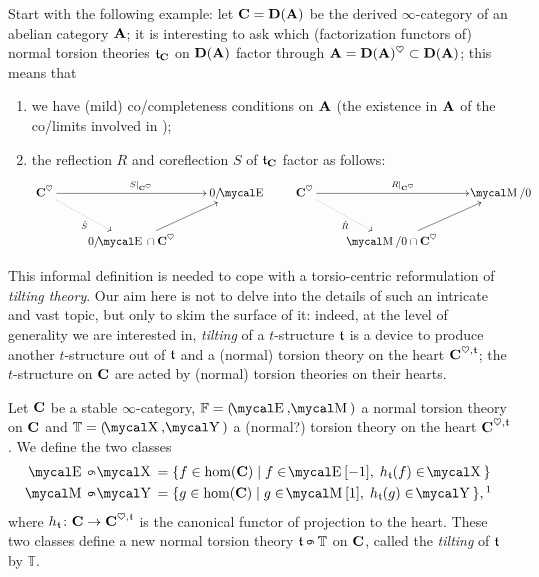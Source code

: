 Start with the following example: let $\textbf{C} = \textbf{D}(\textbf{A})$ be the derived $\infty$\hyp{}category of an abelian category $\textbf{A}$; it is interesting to ask which (factorization functors of) normal torsion theories $\mathfrak{t}_{\textbf{C}}$ on $\textbf{D}(\textbf{A})$ factor through $\textbf{A} = \textbf{D}(\textbf{A})^\heartsuit \subset \textbf{D}(\textbf{A})$; this means that
\begin{enumerate}
\item we have (mild) co\fshyp{}completeness conditions on $\textbf{A}$ (\ie the existence in $\textbf{A}$ of the co\fshyp{}limits involved in );
\item the reflection $R$ and coreflection $S$ of $\mathfrak{t}_{\textbf{C}}$ factor as follows:
\[
\xymatrix{
	\CC^\heart \ar[rr]^{S|_{\CC^\heart}}\ar@{.>}[dr]_{\hat S} && 0/ \EE \\
	 & 0/\EE \cap \CC^\heart \ar[ur]
}\qquad
\xymatrix{
	\CC^\heart \ar[rr]^{R|_{\CC^\heart}}\ar@{.>}[dr]_{\hat R}  && \MM/0 \\
	 & \MM/0 \cap \CC^\heart \ar[ur]
}
\]
\end{enumerate} 
This informal definition is needed to cope with a torsio\hyp{}centric reformulation of \emph{tilting theory}. Our aim here is not to delve into the details of such an intricate and vast topic, but only to skim the surface of it: indeed, 
at the level of generality we are interested in, \emph{tilting} of a $t$\hyp{}structure $\mathfrak{t}$ is a device to produce another $t$\hyp{}structure out of $\mathfrak{t}$ and a (normal) torsion theory on the heart $\textbf{C}^{\heartsuit, \mathfrak{t}}$; the $t$\hyp{}structure on $\textbf{C}$ are acted by (normal) torsion theories on their hearts.
\begin{definition}
Let $\textbf{C}$ be a stable $\infty$\hyp{}category, $\fF = (\EE, \MM)$ a normal torsion theory on $\textbf{C}$ and $\mathbb{T} = (\mcal{X}, \mcal{Y})$ a (normal?) torsion theory on the heart $\textbf{C}^{\heartsuit, \mathfrak{t}}$. We define the two classes
\begin{align}
\EE \tilt \mcal{X} &= \{f\in \hom(\CC)\mid f\in \EE [-1],\; h_\tee(f)\in \mcal{X}\}\notag\\
\MM \tilt \mcal{Y} &= \{g\in \hom(\CC)\mid g\in \MM [1], \; h_\tee(g)\in \mcal{Y}\},\footnotemark
\end{align}
where $h_{\mathfrak{t}}\colon \textbf{C} \to \textbf{C}^{\heartsuit,\mathfrak{t}}$ is the canonical functor of projection to the heart. These two classes define a new normal torsion theory $\tee \tilt \mathbb{T}$ on $\textbf{C}$, called the \emph{tilting} of $\mathfrak{t}$ by $\mathbb T$.
\end{definition}
